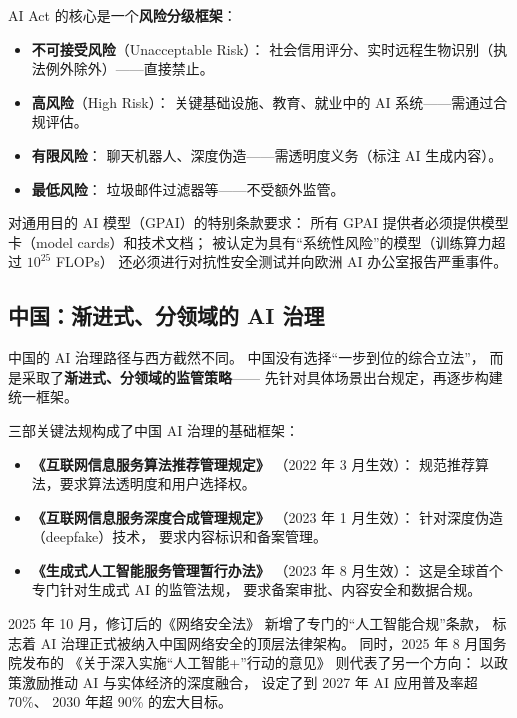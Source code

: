 AI Act 的核心是一个\textbf{风险分级框架}：
\begin{itemize}[noitemsep]
  \item \textbf{不可接受风险}（Unacceptable Risk）：
        社会信用评分、实时远程生物识别（执法例外除外）——直接禁止。
  \item \textbf{高风险}（High Risk）：
        关键基础设施、教育、就业中的 AI 系统——需通过合规评估。
  \item \textbf{有限风险}：
        聊天机器人、深度伪造——需透明度义务（标注 AI 生成内容）。
  \item \textbf{最低风险}：
        垃圾邮件过滤器等——不受额外监管。
\end{itemize}

对通用目的 AI 模型（GPAI）的特别条款要求：
所有 GPAI 提供者必须提供模型卡（model cards）和技术文档；
被认定为具有``系统性风险''的模型（训练算力超过 $10^{25}$ FLOPs）
还必须进行对抗性安全测试并向欧洲 AI 办公室报告严重事件。

\subsection{中国：渐进式、分领域的 AI 治理}

中国的 AI 治理路径与西方截然不同。
中国没有选择``一步到位的综合立法''，
而是采取了\textbf{渐进式、分领域的监管策略}——
先针对具体场景出台规定，再逐步构建统一框架。

三部关键法规构成了中国 AI 治理的基础框架：
\begin{itemize}[noitemsep]
  \item \textbf{《互联网信息服务算法推荐管理规定》}
        （2022 年 3 月生效）：
        规范推荐算法，要求算法透明度和用户选择权。
  \item \textbf{《互联网信息服务深度合成管理规定》}
        （2023 年 1 月生效）：
        针对深度伪造（deepfake）技术，
        要求内容标识和备案管理。
  \item \textbf{《生成式人工智能服务管理暂行办法》}
        （2023 年 8 月生效）：
        这是全球首个专门针对生成式 AI 的监管法规，
        要求备案审批、内容安全和数据合规。
\end{itemize}

2025 年 10 月，修订后的《网络安全法》
新增了专门的``人工智能合规''条款，
标志着 AI 治理正式被纳入中国网络安全的顶层法律架构。
同时，2025 年 8 月国务院发布的
《关于深入实施``人工智能+''行动的意见》
则代表了另一个方向：
以政策激励推动 AI 与实体经济的深度融合，
设定了到 2027 年 AI 应用普及率超 70\%、
2030 年超 90\% 的宏大目标。

